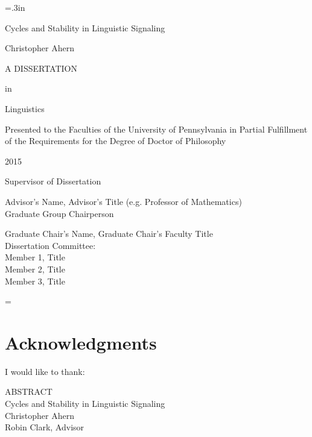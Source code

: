 \documentclass[12pt]{report}
\newcommand{\doublespaced}{\renewcommand{\baselinestretch}{2}\normalfont}
\newcommand{\singlespaced}{\renewcommand{\baselinestretch}{1}\normalfont}
\theoremstyle{definition}
\theoremstyle{remark}
\numberwithin{equation}{section}
\def\thetitle{Cycles and Stability in Linguistic Signaling}
\def\theauthor{Christopher Ahern}
\def\theadvisor{Robin Clark, Advisor}
\def\theyear{2015}
\begin{document}
\large\newlength{\oldparskip}\setlength\oldparskip{\parskip}\parskip=.3in
\thispagestyle{empty}
\begin{center}
\thetitle

\theauthor


A DISSERTATION 

in 

Linguistics
\end{center}


\noindent\singlespaced\large
Presented to the Faculties of the University of Pennsylvania in Partial  
Fulfillment of the Requirements for the Degree of Doctor of Philosophy


\begin{center}
\theyear
\end{center}

\noindent Supervisor of Dissertation

\bigskip
\noindent\makebox[-0.06in][l]{\rule[2ex]{3in}{.3mm}}
\singlespaced
Advisor's Name, Advisor's Title (e.g. Professor of Mathematics)\\

\noindent Graduate Group Chairperson

\bigskip
\noindent\makebox[-0.06in][l]{\rule[2ex]{3in}{.3mm}} 
\singlespaced
Graduate Chair's Name, Graduate Chair's Faculty Title\\


\noindent
\singlespaced
Dissertation Committee:\\
Member 1, Title\\
Member 2, Title\\
Member 3, Title
\vspace*{\fill}

\normalsize\parskip=\oldparskip


\newpage
\doublespaced

\chapter*{Acknowledgments}
I would like to thank:

\newpage
\begin{center}
  ABSTRACT\\
\thetitle\\
\vspace{.5in}
  \theauthor\\
  \theadvisor
\end{center}
\end{document}

